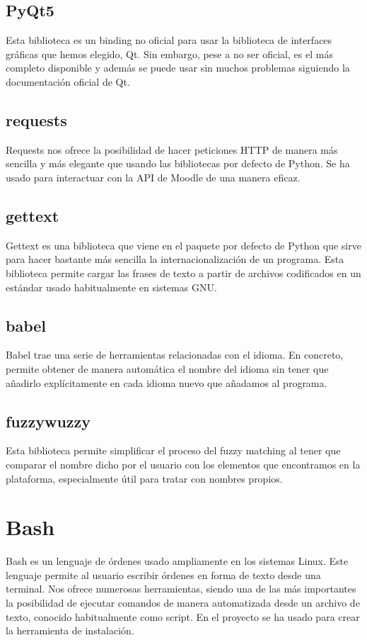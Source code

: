\subsection{PyQt5}
Esta biblioteca es un binding no oficial para usar la biblioteca de interfaces gráficas que hemos elegido, Qt. Sin embargo, pese a no ser oficial, es el más completo disponible y además se puede usar sin muchos problemas siguiendo la documentación oficial de Qt.
\subsection{requests}
Requests nos ofrece la posibilidad de hacer peticiones HTTP de manera más sencilla y más elegante que usando las bibliotecas por defecto de Python. Se ha usado para interactuar con la API de Moodle de una manera eficaz.
\subsection{gettext}
Gettext es una biblioteca que viene en el paquete por defecto de Python que sirve para hacer bastante más sencilla la internacionalización de un programa. Esta biblioteca permite cargar las frases de texto a partir de archivos codificados en un estándar usado habitualmente en sistemas GNU.
\subsection{babel}
Babel trae una serie de herramientas relacionadas con el idioma. En concreto, permite obtener de manera automática el nombre del idioma sin tener que añadirlo explícitamente en cada idioma nuevo que añadamos al programa.
\subsection{fuzzywuzzy}
Esta biblioteca permite simplificar el proceso del fuzzy matching al tener que comparar el nombre dicho por el usuario con los elementos que encontramos en la plataforma, especialmente útil para tratar con nombres propios.

\section{Bash}
Bash es un lenguaje de órdenes usado ampliamente en los sistemas Linux. Este lenguaje permite al usuario escribir órdenes en forma de texto desde una terminal. Nos ofrece numerosas herramientas, siendo una de las más importantes la posibilidad de ejecutar comandos de manera automatizada desde un archivo de texto, conocido habitualmente como script. En el proyecto se ha usado para crear la herramienta de instalación.

